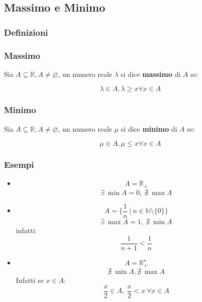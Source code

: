 \subsection{Massimo e Minimo}
\subsubsection*{Definizioni}
\subsubsection{Massimo}
Sia $A \subseteq \mathbb{R}, A \neq \varnothing$, un numero reale $\lambda$ si dice \textbf{massimo} di $A$ se:
\begin{Large}
    \begin{equation*}
        \lambda \in A, \lambda \geq x \forall x \in A
    \end{equation*}
\end{Large}
\subsubsection{Minimo}
Sia $A \subseteq \mathbb{R}, A \neq \varnothing$, un numero reale $\mu$ si dice \textbf{minimo} di $A$ se:
\begin{Large}
    \begin{equation*}
        \mu \in A, \mu \leq x \forall x \in A
    \end{equation*}
\end{Large}
\subsubsection*{Esempi}

    \begin{itemize}
    \item
    \[
        A = \mathbb{R}_{+}    
    \]
    \[
        \exists\ \min{A} = 0,\ \nexists\ \max{A}    
    \]

    \item
    \[
        A = \{\frac{1}{n}\ |\ n\in \mathbb{N}\setminus\{0\}\}
    \]
    \[
        \exists\ \max{A} = 1,\ \nexists\ \min{A}    
    \]
    \newline
    infatti: \[
        \frac{1}{n+1} < \frac{1}{n}
    \]
    \newline
    \item
    \[
        A = \mathbb{R}_{+}^{\star}    
    \]
    \[
        \nexists\ \min{A}, \nexists\ \max{A}    
    \]
    \newline
    Infatti se $x \in A$:
    \[
        \frac{x}{2} \in A,\ \frac{x}{2} < x\ \forall x \in A    
    \]
    \end{itemize}
